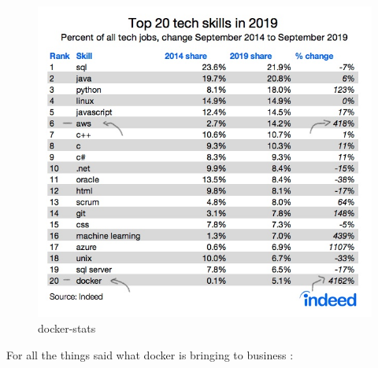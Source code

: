 \documentclass[
  12pt,
  a4paper,
  oneside]{book}
\begin{document}
\begin{figure}
\centering
\includegraphics{images/Inkedindeed_jobs_LI.jpg}
\caption{docker-stats}
\end{figure}

For all the things said what docker is bringing to business \citep{red_hat_customer_portal}:
\end{document}
